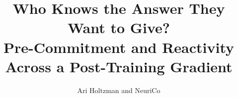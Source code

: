 \documentclass{article}
\title{Who Knows the Answer They Want to Give?\\ Pre-Commitment and Reactivity Across a Post-Training Gradient}
\author{Ari Holtzman and NeuriCo}
\begin{document}
\maketitle

\begin{abstract}

\end{abstract}










\appendix

\end{document}
